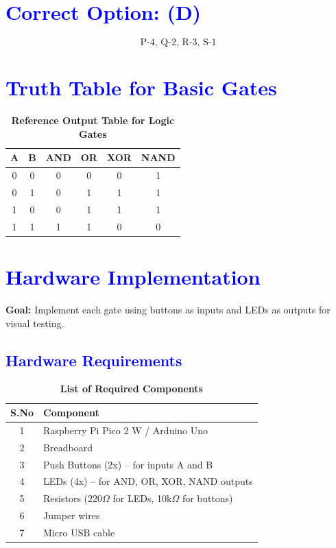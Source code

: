 \documentclass[twocolumn]{article}
\begin{document}
\section*{\textcolor{blue}{Correct Option: (D)}}
\[
\boxed{\text{P-4, Q-2, R-3, S-1}}
\]

\section*{\textcolor{blue}{Truth Table for Basic Gates}}

\begin{table}[h]
\centering
\renewcommand{\arraystretch}{1.3}
\begin{tabular}{|c|c|c|c|c|c|}
\hline
A & B & AND & OR & XOR & NAND \\
\hline
0 & 0 & 0 & 0 & 0 & 1 \\
0 & 1 & 0 & 1 & 1 & 1 \\
1 & 0 & 0 & 1 & 1 & 1 \\
1 & 1 & 1 & 1 & 0 & 0 \\
\hline
\end{tabular}
\caption*{\textbf{Reference Output Table for Logic Gates}}
\end{table}

\section*{\textcolor{blue}{Hardware Implementation}}

\textbf{Goal:} Implement each gate using buttons as inputs and LEDs as outputs for visual testing.

\subsection*{\textcolor{blue}{Hardware Requirements}}

\begin{table}[h]
\centering
\renewcommand{\arraystretch}{1.3}
\begin{tabular}{|c|l|}
\hline
\textbf{S.No} & \textbf{Component} \\
\hline
1 & Raspberry Pi Pico 2 W / Arduino Uno \\
2 & Breadboard \\
3 & Push Buttons (2x) – for inputs A and B \\
4 & LEDs (4x) – for AND, OR, XOR, NAND outputs \\
5 & Resistors (220$\Omega$ for LEDs, 10k$\Omega$ for buttons) \\
6 & Jumper wires \\
7 & Micro USB cable \\
\hline
\end{tabular}
\caption*{\textbf{List of Required Components}}
\end{table}
\end{document}
